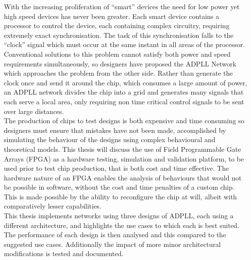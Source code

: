 \documentclass[11pt,english,british]{report}
\begin{document}
With the increasing proliferation of ``smart'' devices the need for low power yet high speed devices has never been greater. Each smart device contains a processor to control the device, each containing complex circuitry, requiring extremely exact synchronisation. The task of this synchronisation falls to the ``clock'' signal which must occur at the same instant in all areas of the processor. Conventional solutions to this problem cannot satisfy both power and speed requirements simultaneously, so designers have proposed the ADPLL Network which approaches the problem from the other side. Rather than generate the clock once and send it around the chip, which consumes a large amount of power, an ADPLL network divides the chip into a grid and generates many signals that each serve a local area, only requiring non time critical control signals to be sent over large distances.\\
The production of chips to test designs is both expensive and time consuming so designers must ensure that mistakes have not been made, accomplished by simulating the behaviour of the designs using complex behavioural and theoretical models. This thesis will discuss the use of Field Programmable Gate Arrays (FPGA) as a hardware testing, simulation and validation platform, to be used prior to test chip production, that is both cost and time effective. The hardware nature of an FPGA enables the analysis of behaviours that would not be possible in software, without the cost and time penalties of a custom chip. This is made possible by the ability to reconfigure the chip at will, albeit with comparatively lesser capabilities.\\
This thesis implements networks using three designs of ADPLL, each using a different architecture, and highlights the use cases to which each is best suited. The performance of each design is then analysed and this compared to the suggested use cases. Additionally the impact of more minor architectural modifications is tested and documented.
\end{document}
